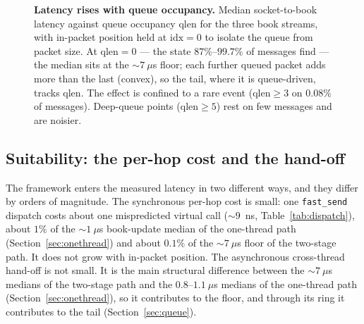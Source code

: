 \documentclass[11pt]{article}
\newcommand{\fs}{\texttt{fast\_send}}
\begin{document}
\begin{figure}[!htb]
\centering
{}
\caption{\textbf{Latency rises with queue occupancy.} Median socket-to-book latency against queue occupancy $\text{qlen}$ for the three book streams, with
in-packet position held at $\text{idx}=0$ to isolate the queue from packet size.
At $\text{qlen}=0$ --- the state $87\%$--$99.7\%$ of messages find --- the median
sits at the $\sim\!7~\mu$s floor; each further queued packet adds more than the
last (convex), so the tail, where it is queue-driven, tracks $\text{qlen}$. The
effect is confined to a rare event ($\text{qlen}\ge3$ on $0.08\%$ of messages).
Deep-queue points ($\text{qlen}\ge5$) rest on few messages and are noisier.}
\label{fig:convex}
\end{figure}

\subsection{Suitability: the per-hop cost and the hand-off}
\label{sec:suitability}
\label{sec:arrival}

The framework enters the measured latency in two different ways, and they
differ by orders of magnitude. The synchronous per-hop cost is small: one \fs{}
dispatch costs about one mispredicted virtual call ($\sim\!9$~ns,
Table~\ref{tab:dispatch}), about $1\%$ of the $\sim\!1~\mu$s book-update median
of the one-thread path (Section~\ref{sec:onethread}) and about $0.1\%$ of the
$\sim\!7~\mu$s floor of the two-stage path. It does not grow with in-packet
position. The asynchronous cross-thread hand-off is not small. It is the main
structural difference between the $\sim\!7~\mu$s medians of the two-stage path
and the $0.8$--$1.1~\mu$s medians of the one-thread path
(Section~\ref{sec:onethread}), so it contributes to the floor, and through its
ring it contributes to the tail (Section~\ref{sec:queue}).
\end{document}
